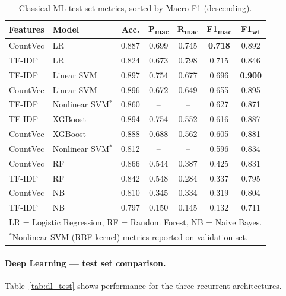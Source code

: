\documentclass[11pt,a4paper]{article}
\begin{document}
\begin{table}[h!] 
\centering 
\caption{Classical ML test-set metrics, sorted by Macro F1 (descending).} 
\label{tab:ml_test} 
\setlength\tabcolsep{4pt} 
\begin{tabular}{llccccc} 
\toprule 
\textbf{Features} & \textbf{Model} & \textbf{Acc.} & \textbf{P\textsubscript{mac}} & \textbf{R\textsubscript{mac}} & \textbf{F1\textsubscript{mac}} & \textbf{F1\textsubscript{wt}} \\ 
\midrule 
CountVec & LR & 0.887 & 0.699 & 0.745 & \textbf{0.718} & 0.892 \\ 
TF-IDF & LR & 0.824 & 0.673 & 0.798 & 0.715 & 0.846 \\ 
TF-IDF & Linear SVM & 0.897 & 0.754 & 0.677 & 0.696 & \textbf{0.900} \\ 
CountVec & Linear SVM & 0.896 & 0.672 & 0.649 & 0.655 & 0.895 \\ 
TF-IDF & Nonlinear SVM$^\ast$ & 0.860 & -- & -- & 0.627 & 0.871 \\
TF-IDF & XGBoost & 0.894 & 0.754 & 0.552 & 0.616 & 0.887 \\ 
CountVec & XGBoost & 0.888 & 0.688 & 0.562 & 0.605 & 0.881 \\ 
CountVec & Nonlinear SVM$^\ast$ & 0.812 & -- & -- & 0.596 & 0.834 \\
CountVec & RF & 0.866 & 0.544 & 0.387 & 0.425 & 0.831 \\ 
TF-IDF & RF & 0.842 & 0.548 & 0.284 & 0.337 & 0.795 \\ 
CountVec & NB & 0.810 & 0.345 & 0.334 & 0.319 & 0.804 \\ 
TF-IDF & NB & 0.797 & 0.150 & 0.145 & 0.132 & 0.711 \\ 
\bottomrule 
\multicolumn{7}{l}{\footnotesize LR = Logistic Regression, RF = Random Forest, NB = Naive Bayes.} \\
\multicolumn{7}{l}{\footnotesize $^\ast$Nonlinear SVM (RBF kernel) metrics reported on validation set.} 
\end{tabular} 
\end{table}


\paragraph{Deep Learning --- test set comparison.}

Table~\ref{tab:dl_test} shows performance for the three recurrent architectures.
\end{document}
